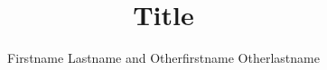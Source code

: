 \author{Firstname Lastname and Otherfirstname Otherlastname} %
\title{Title}
\renewcommand{\lsSeries}{eotms}
\renewcommand{\lsSeriesNumber}{}
